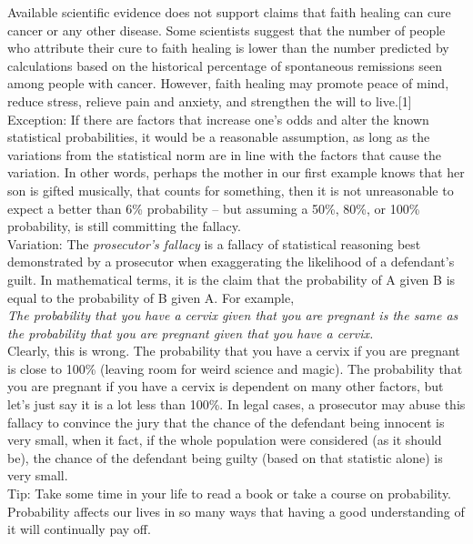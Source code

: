 \documentclass[a4paper,12pt,single,pdftex]{scrartcl}
\begin{document}
{    
      Available scientific evidence does not support claims that faith healing can cure cancer or any other disease. Some scientists suggest that the number of people who attribute their cure to faith healing is lower than the number predicted by calculations based on the historical percentage of spontaneous remissions seen among people with cancer. However, faith healing may promote peace of mind, reduce stress, relieve pain and anxiety, and strengthen the will to live.[1]
    \\

    
      Exception: If there are factors that increase one’s odds and alter the known statistical probabilities, it would be a reasonable assumption, as long as the variations from the statistical norm are in line with the factors that cause the variation.  In other words, perhaps the mother in our first example knows that her son is gifted musically, that counts for something, then it is not unreasonable to expect a better than 6\% probability -- but assuming a 50\%, 80\%, or 100\% probability, is still committing the fallacy.
    \\

    
      Variation: The {\em prosecutor's fallacy} is a fallacy of statistical reasoning best demonstrated by a prosecutor when exaggerating the likelihood of a defendant's guilt. In mathematical terms, it is the claim that the probability of A given B is equal to the probability of B given A. For example,
    \\

    
      {\em The probability that you have a cervix given that you are pregnant is the same as the probability that you are pregnant given that you have a cervix.}
    \\

    
      Clearly, this is wrong. The probability that you have a cervix if you are pregnant is close to 100\% (leaving room for weird science and magic). The probability that you are pregnant if you have a cervix is dependent on many other factors, but let’s just say it is a lot less than 100\%. In legal cases, a prosecutor may abuse this fallacy to convince the jury that the chance of the defendant being innocent is very small, when it fact, if the whole population were considered (as it should be), the chance of the defendant being guilty (based on that statistic alone) is very small.
    \\

    
      Tip: Take some time in your life to read a book or take a course on probability.  Probability affects our lives in so many ways that having a good understanding of it will continually pay off.
    \\

  }
\end{document}
